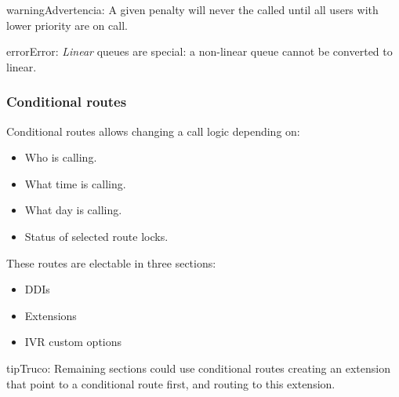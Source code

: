 \documentclass[letterpaper,10pt,spanish]{sphinxmanual}
\begin{document}
\begin{notice}{warning}{Advertencia:}
A given penalty will never the called until all users with lower priority are on call.
\end{notice}

\begin{notice}{error}{Error:}
\emph{Linear} queues are special: a non-linear queue cannot be converted to linear.
\end{notice}
\label{administration_portal/client/vpbx/routing_endpoints/conditional_routes:conditional-routes}

\subsubsection{Conditional routes}
\label{administration_portal/client/vpbx/routing_endpoints/conditional_routes:id2}\label{administration_portal/client/vpbx/routing_endpoints/conditional_routes::doc}\label{administration_portal/client/vpbx/routing_endpoints/conditional_routes:conditional-routes}\label{administration_portal/client/vpbx/routing_endpoints/conditional_routes:id1}
Conditional routes allows changing a call logic depending on:
\begin{itemize}
\item {} 
Who is calling.

\item {} 
What time is calling.

\item {} 
What day is calling.

\item {} 
Status of selected route locks.

\end{itemize}

These routes are electable in three sections:
\begin{itemize}
\item {} 
DDIs

\item {} 
Extensions

\item {} 
IVR custom options

\end{itemize}

\begin{notice}{tip}{Truco:}
Remaining sections could use conditional routes creating an extension
that point to a conditional route first, and routing to this extension.
\end{notice}
\end{document}
